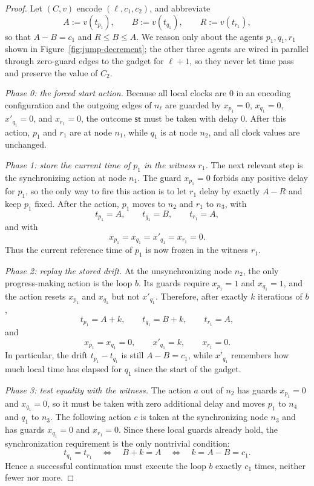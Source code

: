 \begin{proof}
Let $(C,v)$ encode $(\ell,c_1,c_2)$, and abbreviate
\[
A:=v(t_{p_1}),\qquad B:=v(t_{q_1}),\qquad R:=v(t_{r_1}),
\]
so that $A-B=c_1$ and $R\le B\le A$.  We reason only about the agents
$p_1,q_1,r_1$ shown in Figure~\ref{fig:jump-decrement}; the other three agents
are wired in parallel through zero-guard edges to the gadget for
$\ell+1$, so they never let time pass and preserve the value of $C_2$.

\smallskip
\noindent\emph{Phase 0: the forced start action.}
Because all local clocks are $0$ in an encoding configuration and the outgoing
edges of $n_\ell$ are guarded by
$x_{p_1}=0$, $x_{q_1}=0$, $x'_{q_1}=0$, and $x_{r_1}=0$, the outcome
$\mathsf{st}$ must be taken with delay $0$.  After this action, $p_1$ and
$r_1$ are at node $n_1$, while $q_1$ is at node $n_2$, and all clock values
are unchanged.

\smallskip
\noindent\emph{Phase 1: store the current time of $p_1$ in the witness $r_1$.}
The next relevant step is the synchronizing action at node $n_1$.  The guard
$x_{p_1}=0$ forbids any positive delay for $p_1$, so the only way to fire this
action is to let $r_1$ delay by exactly $A-R$ and keep $p_1$ fixed.  After the
action, $p_1$ moves to $n_2$ and $r_1$ to $n_3$, with
\[
t_{p_1}=A,\qquad t_{q_1}=B,\qquad t_{r_1}=A,
\]
and with
\[
x_{p_1}=x_{q_1}=x'_{q_1}=x_{r_1}=0.
\]
Thus the current reference time of $p_1$ is now frozen in the witness $r_1$.

\smallskip
\noindent\emph{Phase 2: replay the stored drift.}
At the unsynchronizing node $n_2$, the only progress-making action is the loop
$b$.  Its guards require $x_{p_1}=1$ and $x_{q_1}=1$, and the action resets
$x_{p_1}$ and $x_{q_1}$ but not $x'_{q_1}$.  Therefore, after exactly $k$
iterations of $b$,
\[
t_{p_1}=A+k,\qquad t_{q_1}=B+k,\qquad t_{r_1}=A,
\]
and
\[
x_{p_1}=x_{q_1}=0,\qquad x'_{q_1}=k,\qquad x_{r_1}=0.
\]
In particular, the drift $t_{p_1}-t_{q_1}$ is still $A-B=c_1$, while
$x'_{q_1}$ remembers how much local time has elapsed for $q_1$ since the start
of the gadget.

\smallskip
\noindent\emph{Phase 3: test equality with the witness.}
The action $a$ out of $n_2$ has guards $x_{p_1}=0$ and $x_{q_1}=0$, so it must
be taken with zero additional delay and moves $p_1$ to $n_4$ and $q_1$ to
$n_3$.  The following action $c$ is taken at the synchronizing node $n_3$ and
has guards $x_{q_1}=0$ and $x_{r_1}=0$.  Since these local guards already hold,
the synchronization requirement is the only nontrivial condition:
\[
t_{q_1}=t_{r_1}
\quad\Longleftrightarrow\quad
B+k=A
\quad\Longleftrightarrow\quad
k=A-B=c_1.
\]
Hence a successful continuation must execute the loop $b$ exactly $c_1$ times,
neither fewer nor more.


\end{proof}
